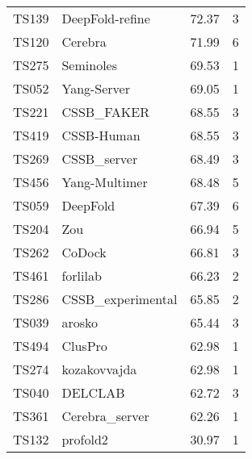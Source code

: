 \begin{table*}[ht]
\begin{minipage}[t]{0.48\textwidth}
\begin{tabular}{llrr}
TS139 & DeepFold-refine & 72.37 & 3 \\ 
TS120 & Cerebra & 71.99 & 6 \\ 
TS275 & Seminoles & 69.53 & 1 \\ 
TS052 & Yang-Server & 69.05 & 1 \\ 
TS221 & CSSB\_FAKER & 68.55 & 3 \\ 
TS419 & CSSB-Human & 68.55 & 3 \\ 
TS269 & CSSB\_server & 68.49 & 3 \\ 
TS456 & Yang-Multimer & 68.48 & 5 \\ 
TS059 & DeepFold & 67.39 & 6 \\ 
TS204 & Zou & 66.94 & 5 \\ 
TS262 & CoDock & 66.81 & 3 \\ 
TS461 & forlilab & 66.23 & 2 \\ 
TS286 & CSSB\_experimental & 65.85 & 2 \\ 
TS039 & arosko & 65.44 & 3 \\ 
TS494 & ClusPro & 62.98 & 1 \\ 
TS274 & kozakovvajda & 62.98 & 1 \\ 
TS040 & DELCLAB & 62.72 & 3 \\ 
TS361 & Cerebra\_server & 62.26 & 1 \\ 
TS132 & profold2 & 30.97 & 1 \\ 
\bottomrule
\end{tabular}
\end{minipage}
\end{table*}
